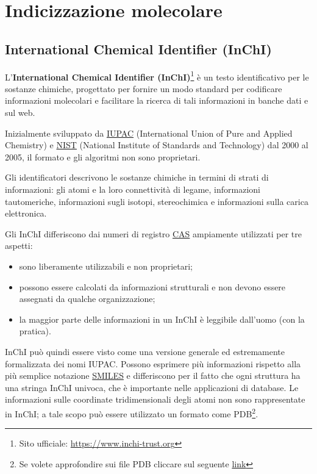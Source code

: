 \chapter{Indicizzazione molecolare}

\section{International Chemical Identifier (InChI)}\label{sec:InChI}
L'\textbf{International Chemical Identifier (InChI)}\footnote{Sito ufficiale: \url{https://www.inchi-trust.org}} è un testo identificativo per le sostanze chimiche, progettato per fornire un modo standard per codificare informazioni molecolari e facilitare la ricerca di tali informazioni in banche dati e sul web.

Inizialmente sviluppato da \href{https://iupac.org}{IUPAC}  (International Union of Pure and Applied Chemistry) e \href{https://www.nist.gov}{NIST} (National Institute of Standards and Technology) dal 2000 al 2005, il formato e gli algoritmi non sono proprietari.

Gli identificatori descrivono le sostanze chimiche in termini di strati di informazioni: gli atomi e la loro connettività di legame, informazioni tautomeriche, informazioni sugli isotopi, stereochimica e informazioni sulla carica elettronica.

Gli InChI differiscono dai numeri di registro \hyperref[sec:CAS]{CAS} ampiamente utilizzati per tre aspetti:
\begin{itemize}
	\item sono liberamente utilizzabili e non proprietari;
	\item possono essere calcolati da informazioni strutturali e non devono essere assegnati da qualche organizzazione;
	\item la maggior parte delle informazioni in un InChI è leggibile dall'uomo (con la pratica).
\end{itemize}
InChI può quindi essere visto come una versione generale ed estremamente formalizzata dei nomi IUPAC. Possono esprimere più informazioni rispetto alla più semplice notazione \hyperref[sec:smiles]{SMILES} e differiscono per il fatto che ogni struttura ha una stringa InChI univoca, che è importante nelle applicazioni di database. Le informazioni sulle coordinate tridimensionali degli atomi non sono rappresentate in InChI; a tale scopo può essere utilizzato un formato come PDB\footnote{Se volete approfondire sui file PDB cliccare sul seguente \href{https://www.cgl.ucsf.edu/chimera/docs/UsersGuide/tutorials/pdbintro.html}{link}}.

